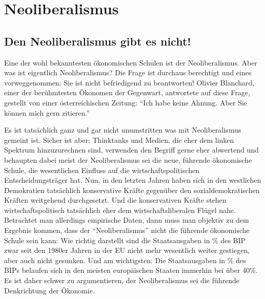 %
%
%

\chapter{Neoliberalismus}
\label{Neoliberalismus}

\section{Den Neoliberalismus gibt es nicht!}


Eine der wohl bekanntesten ökonomischen Schulen ist der Neoliberalismus. Aber was ist eigentlich Neoliberalismus? Die Frage ist durchaus berechtigt und eines vorweggenommen: Sie ist nicht befriedigend zu beantworten!
Olivier Blanchard, einer der berühmtesten Ökonomen der Gegenwart, antwortete auf diese Frage, gestellt von einer österreichischen Zeitung: "`Ich habe keine Ahnung. Aber Sie können mich gern zitieren."' \parencite{Widmann2020} 


Es ist tatsächlich ganz und gar nicht unumstritten was mit Neoliberalismus gemeint ist. Sicher ist aber: Thinktanks und Medien, die eher dem linken Spektrum hinzuzurechnen sind, verwenden den Begriff gerne eher abwertend und behaupten dabei meist der Neoliberalismus sei die neue, führende ökonomische Schule, die wesentlichen Einfluss auf die wirtschaftspolitischen Entscheidungsträger hat. Nun, in den letzten Jahren haben sich in den westlichen Demokratien tatsächlich konservative Kräfte gegenüber den sozialdemokratischen Kräften weitgehend durchgesetzt. Und die konservativen Kräfte stehen wirtschaftspolitisch tatsächlich eher dem wirtschaftsliberalen Flügel nahe. Betrachtet man allerdings empirische Daten, dann muss man objektiv zu dem Ergebnis kommen, dass der "`Neoliberalismus"' nicht die führende ökonomische Schule sein kann: Wie \textcite{Aiginger2016} richtig darstellt sind die Staatsausgaben in \% des BIP zwar seit den 1980er Jahren in der EU nicht mehr wesentlich weiter gestiegen, aber auch nicht gesunken. Und am wichtigsten: Die Staatsausgaben in \% des BIPs belaufen sich in den meisten europäischen Staaten immerhin bei über 40\%. Es ist daher schwer zu argumentieren, der Neoliberalismus sei die führende Denkrichtung der Ökonomie.


